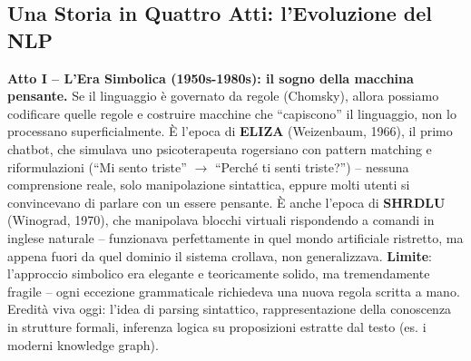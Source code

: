 \documentclass[12pt,a4paper]{article}
\begin{document}
\subsection{Una Storia in Quattro Atti: l'Evoluzione del NLP}

\begin{defbox}
\textbf{Atto I -- L'Era Simbolica (1950s-1980s): il sogno della macchina pensante.}
Se il linguaggio \`e governato da regole (Chomsky), allora possiamo codificare quelle regole e costruire macchine che ``capiscono'' il linguaggio, non lo processano superficialmente. \`E l'epoca di \textbf{ELIZA} (Weizenbaum, 1966), il primo chatbot, che simulava uno psicoterapeuta rogersiano con pattern matching e riformulazioni (``Mi sento triste'' $\to$ ``Perch\'e ti senti triste?'') -- nessuna comprensione reale, solo manipolazione sintattica, eppure molti utenti si convincevano di parlare con un essere pensante. \`E anche l'epoca di \textbf{SHRDLU} (Winograd, 1970), che manipolava blocchi virtuali rispondendo a comandi in inglese naturale -- funzionava perfettamente in quel mondo artificiale ristretto, ma appena fuori da quel dominio il sistema crollava, non generalizzava. \textbf{Limite}: l'approccio simbolico era elegante e teoricamente solido, ma tremendamente fragile -- ogni eccezione grammaticale richiedeva una nuova regola scritta a mano. Eredit\`a viva oggi: l'idea di parsing sintattico, rappresentazione della conoscenza in strutture formali, inferenza logica su proposizioni estratte dal testo (es. i moderni knowledge graph).
\end{defbox}
\end{document}
